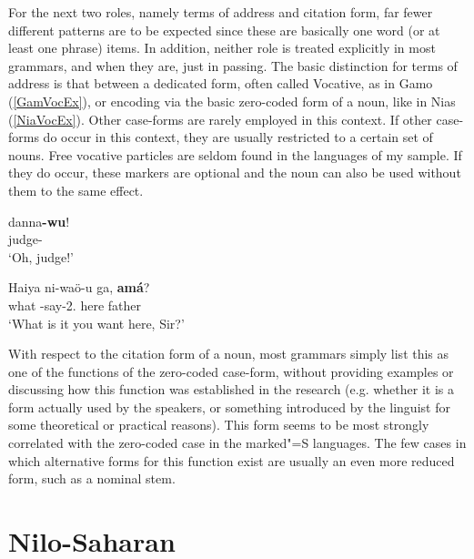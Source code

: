 For the next two roles, namely terms of address and citation form, far fewer different patterns are to be expected since these are basically one word (or at least one phrase) items. 
In addition, neither role is treated explicitly in most grammars, and when they are, just in passing.
The basic distinction for terms of address is that between a dedicated form, often called Vocative, as in Gamo (\ref{GamVocEx}), or encoding via the basic zero-coded form of a noun, like in Nias (\ref{NiaVocEx}). 
Other case-forms are rarely employed in this context. 
If other case-forms do occur in this context, they are usually restricted to a certain set of nouns. 
Free vocative particles are seldom found in the languages of my sample. 
If they do occur, these markers are optional and the noun can also be used without them to the same effect.

\begin{exe}\ex\label{GamVocEx}
\gll danna\textbf{-wu}!\\
judge-\voc{}\\
\glt `Oh, judge!'
\end{exe}

\begin{exe}\ex\label{NiaVocEx} 
\gll Haiya ni-wa\"o-u ga,  \textbf{am\'a}?\\
what \pass{}-say-2\sg{}.\poss{} here father\\
\glt`What is it you want here, Sir?'
\end{exe}

With respect to the citation form of a noun, most grammars simply list this as one of the functions of the zero-coded case-form, without providing examples or discussing how this function was established in the research (e.g. whether it is a form actually used by the speakers, or something introduced by the linguist for some theoretical or practical reasons). 
This form seems to be most strongly correlated with the zero-coded case in the marked"=S languages. 
The few cases in which alternative forms for this function exist are usually an even more reduced form, such as a nominal stem.

\section{Nilo-Saharan}\label{ExtraNilo}

